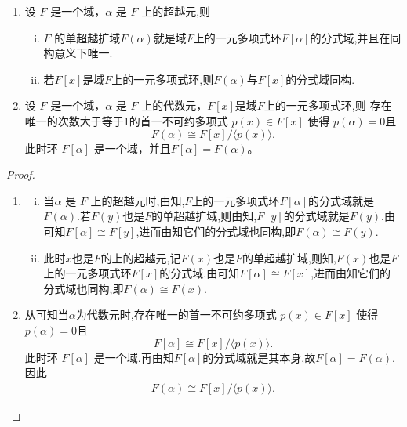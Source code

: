 \documentclass[../../main.tex]{subfiles}%
\begin{document}
\begin{theorem}\label{theorem:单代数和超越扩域的基本结论}
\begin{enumerate}[(1)]
\item\label{theorem:单代数和超越扩域的基本结论-1} 设 \( F \) 是一个域，\(\alpha\) 是 \( F \) 上的超越元,则
\begin{enumerate}[(i)]
\item \( F \) 的单超越扩域$F(\alpha)$就是域$F$上的一元多项式环$F[\alpha]$的分式域,并且在同构意义下唯一.

\item 若$F[x]$是域$F$上的一元多项式环,则\( F(\alpha) \)与$F[x]$的分式域同构.
\end{enumerate}

\item\label{theorem:单代数和超越扩域的基本结论-2} 设 \( F \) 是一个域，\( \alpha \) 是 \( F \) 上的代数元，$F[x]$是域$F$上的一元多项式环,则
存在唯一的次数大于等于1的首一不可约多项式 \( p(x) \in F[x] \) 使得 \( p(\alpha) = 0 \)且
\[
F(\alpha) \cong F[x] / \langle p(x) \rangle.
\]
此时环 \( F[\alpha] \) 是一个域，并且\( F[\alpha] = F(\alpha) \)。
\end{enumerate}
\end{theorem}
\begin{proof}
\begin{enumerate}[(1)]
\item \begin{enumerate}[(i)]
\item 当\(\alpha\) 是 \( F \) 上的超越元时,由知,$F$上的一元多项式环$F[\alpha]$的分式域就是$F(\alpha)$.若$F(y)$也是$F$的单超越扩域,则由知,$F[y]$的分式域就是$F(y)$.由可知$F[\alpha]\cong F[y]$,进而由知它们的分式域也同构,即$F(\alpha)\cong F(y)$.

\item 此时$x$也是$F$的上的超越元,记$F(x)$也是$F$的单超越扩域,则知,$F(x)$也是$F$上的一元多项式环$F[x]$的分式域.由可知$F[\alpha]\cong F[x]$,进而由知它们的分式域也同构,即$F(\alpha)\cong F(x)$.

\end{enumerate}

\item 从可知当$\alpha$为代数元时,存在唯一的首一不可约多项式 \( p(x) \in F[x] \) 使得 \( p(\alpha) = 0 \)且
\[
F[\alpha] \cong F[x] / \langle p(x) \rangle.
\]
此时环 \( F[\alpha] \) 是一个域.再由知$F[\alpha]$的分式域就是其本身,故$F[\alpha]=F(\alpha)$.因此
\begin{align*}
F(\alpha) \cong F[x] / \langle p(x) \rangle.
\end{align*}
\end{enumerate}

\end{proof}
\end{document}
